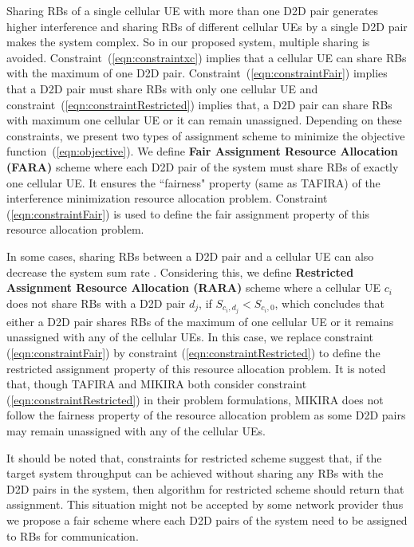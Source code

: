 \documentclass{ieeeaccess}
\begin{document}
\smallskip

Sharing RBs of a single cellular UE with more than one D2D pair generates higher interference and sharing RBs of different cellular UEs by a single D2D pair makes the system complex. So in our proposed system, multiple sharing is avoided. Constraint~(\ref{eqn:constraintxc}) implies that a cellular UE can share RBs with the maximum of one D2D pair. 
Constraint~(\ref{eqn:constraintFair}) implies that a D2D pair must share RBs with only one cellular UE and constraint~(\ref{eqn:constraintRestricted}) implies that, a D2D pair can share RBs with maximum one cellular UE or it can remain unassigned. Depending on these constraints, we present two types of assignment scheme to minimize the objective function~(\ref{eqn:objective}). We define \textbf{Fair Assignment Resource Allocation (FARA)} scheme where each D2D pair of the system must share RBs of exactly one cellular UE. It ensures the ``fairness" property (same as TAFIRA) of the interference minimization resource allocation problem. Constraint~ (\ref{eqn:constraintFair}) is used to define the fair assignment property of this resource allocation problem. 

\smallskip
 
In some cases, sharing RBs between a D2D pair and a cellular UE can also decrease the system sum rate \cite{ccnc, cai_cap}. Considering this, we define \textbf{Restricted Assignment Resource Allocation (RARA)} scheme where a cellular UE $c_i$ does not share RBs with a D2D pair $d_j$, if $S_{c_i,d_j} < S_{c_i,0}$, which concludes that either a D2D pair shares RBs of the maximum of one cellular UE or it remains unassigned with any of the cellular UEs. In this case, we replace constraint (\ref{eqn:constraintFair}) by constraint (\ref{eqn:constraintRestricted}) to define the restricted assignment property of this resource allocation problem. It is noted that, though TAFIRA \cite{islam2016radio} and MIKIRA \cite{islam2015reducing} both consider constraint (\ref{eqn:constraintRestricted}) in their problem formulations, MIKIRA does not follow the fairness property of the resource allocation problem as some D2D pairs may remain unassigned with any of the cellular UEs.

\smallskip

It should be noted that, constraints for restricted scheme suggest that, if the target system throughput can be achieved without sharing any RBs with the D2D pairs in the system, then algorithm for restricted scheme should return that assignment. This situation might not be accepted by some network provider thus we propose a fair scheme where each D2D pairs of the system need to be assigned to RBs for communication.
\end{document}
